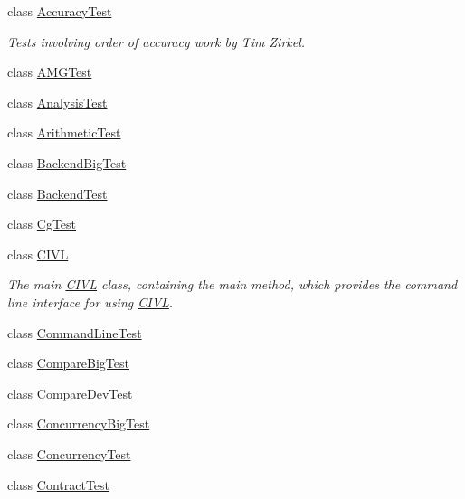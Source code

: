 \begin{DoxyCompactItemize}
\item 
class \hyperlink{classedu_1_1udel_1_1cis_1_1vsl_1_1civl_1_1AccuracyTest}{Accuracy\+Test}
\begin{DoxyCompactList}\small\item\em Tests involving order of accuracy work by Tim Zirkel. \end{DoxyCompactList}\item 
class \hyperlink{classedu_1_1udel_1_1cis_1_1vsl_1_1civl_1_1AMGTest}{A\+M\+G\+Test}
\item 
class \hyperlink{classedu_1_1udel_1_1cis_1_1vsl_1_1civl_1_1AnalysisTest}{Analysis\+Test}
\item 
class \hyperlink{classedu_1_1udel_1_1cis_1_1vsl_1_1civl_1_1ArithmeticTest}{Arithmetic\+Test}
\item 
class \hyperlink{classedu_1_1udel_1_1cis_1_1vsl_1_1civl_1_1BackendBigTest}{Backend\+Big\+Test}
\item 
class \hyperlink{classedu_1_1udel_1_1cis_1_1vsl_1_1civl_1_1BackendTest}{Backend\+Test}
\item 
class \hyperlink{classedu_1_1udel_1_1cis_1_1vsl_1_1civl_1_1CgTest}{Cg\+Test}
\item 
class \hyperlink{classedu_1_1udel_1_1cis_1_1vsl_1_1civl_1_1CIVL}{C\+I\+V\+L}
\begin{DoxyCompactList}\small\item\em The main \hyperlink{classedu_1_1udel_1_1cis_1_1vsl_1_1civl_1_1CIVL}{C\+I\+V\+L} class, containing the main method, which provides the command line interface for using \hyperlink{classedu_1_1udel_1_1cis_1_1vsl_1_1civl_1_1CIVL}{C\+I\+V\+L}. \end{DoxyCompactList}\item 
class \hyperlink{classedu_1_1udel_1_1cis_1_1vsl_1_1civl_1_1CommandLineTest}{Command\+Line\+Test}
\item 
class \hyperlink{classedu_1_1udel_1_1cis_1_1vsl_1_1civl_1_1CompareBigTest}{Compare\+Big\+Test}
\item 
class \hyperlink{classedu_1_1udel_1_1cis_1_1vsl_1_1civl_1_1CompareDevTest}{Compare\+Dev\+Test}
\item 
class \hyperlink{classedu_1_1udel_1_1cis_1_1vsl_1_1civl_1_1ConcurrencyBigTest}{Concurrency\+Big\+Test}
\item 
class \hyperlink{classedu_1_1udel_1_1cis_1_1vsl_1_1civl_1_1ConcurrencyTest}{Concurrency\+Test}
\item 
class \hyperlink{classedu_1_1udel_1_1cis_1_1vsl_1_1civl_1_1ContractTest}{Contract\+Test}

\end{DoxyCompactItemize}
